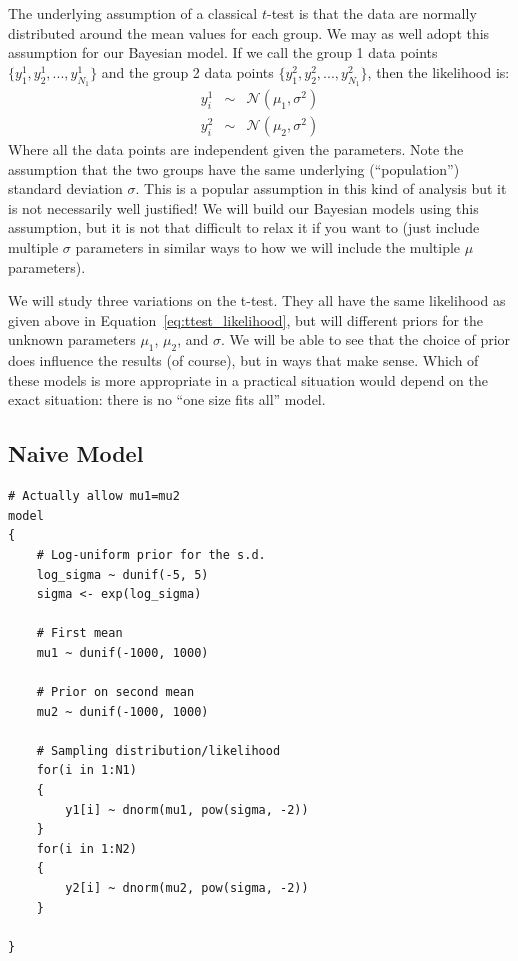 The underlying assumption of a classical $t$-test is that the data are normally
distributed around the mean values for each group. We may as well adopt this
assumption for our Bayesian model. If we call the group 1
data points $\{y^1_1, y^1_2, ..., y^1_{N_1}\}$ and the group 2 data points
$\{y^2_1, y^2_2, ..., y^2_{N_1}\}$, then the likelihood is:
\begin{eqnarray}
y^1_i &\sim& \mathcal{N}\left(\mu_1, \sigma^2\right)\nonumber\\
y^2_i &\sim& \mathcal{N}\left(\mu_2, \sigma^2\right)\label{eq:ttest_likelihood}
\end{eqnarray}
Where all the data points are independent given the parameters. Note the assumption that
the two groups have the same underlying (``population'') standard deviation $\sigma$. This is a popular
assumption in this kind of analysis but it is not necessarily well justified!
We will build our Bayesian models using this assumption, but it is not that
difficult to relax it if you want to (just include multiple $\sigma$ parameters
in similar ways to how we will include the multiple $\mu$ parameters).

We will study three variations on the t-test. They all have the same likelihood
as given above in Equation~\ref{eq:ttest_likelihood},
but will different priors for the unknown parameters $\mu_1$, $\mu_2$, and
$\sigma$.
We will be able to see that the choice of prior does
influence the results (of course), but in ways that make sense. Which of these
models is more appropriate in a practical situation would depend on the exact
situation: there is no ``one size fits all'' model.

\subsection{Naive Model}

\begin{framed}
\begin{verbatim}
# Actually allow mu1=mu2
model
{
    # Log-uniform prior for the s.d.
    log_sigma ~ dunif(-5, 5)
    sigma <- exp(log_sigma)

    # First mean
    mu1 ~ dunif(-1000, 1000)

    # Prior on second mean
    mu2 ~ dunif(-1000, 1000)

    # Sampling distribution/likelihood
    for(i in 1:N1)
    {
        y1[i] ~ dnorm(mu1, pow(sigma, -2))
    }
    for(i in 1:N2)
    {
        y2[i] ~ dnorm(mu2, pow(sigma, -2))
    }

}
\end{verbatim}
\end{framed}

